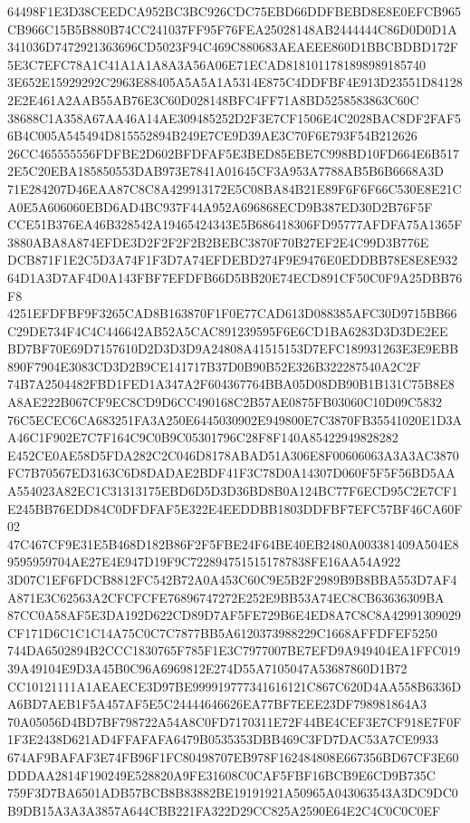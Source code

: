 \documentclass[UTF8,fontset=fandol,zihao=-4,a4paper]{ctexart}
\begin{document}
{{64498F1E3D38CEEDCA952BC3BC926CDC75EBD66DDFBEBD8E8E0EFCB965CB966C15B5B880B74CC241037FF95F76FEA25028148AB2444444C86D0D0D1A
341036D7472921363696CD5023F94C469C880683AEAEEE860D1BBCBDBD172F5E3C7EFC78A1C41A1A1A8A3A56A06E71ECAD8181011781898989185740
3E652E15929292C2963E88405A5A5A1A5314E875C4DDFBF4E913D23551D841282E2E461A2AAB55AB76E3C60D028148BFC4FF71A8BD5258583863C60C
38688C1A358A67AA46A14AE309485252D2F3E7CF1506E4C2028BAC8DF2FAF56B4C005A545494D815552894B249E7CE9D39AE3C70F6E793F54B212626
26CC465555556FDFBE2D602BFDFAF5E3BED85EBE7C998BD10FD664E6B5172E5C20EBA185850553DAB973E7841A01645CF3A953A7788AB5B6B6668A3D
71E284207D46EAA87C8C8A429913172E5C08BA84B21E89F6F6F66C530E8E21CA0E5A606060EBD6AD4BC937F44A952A696868ECD9B387ED30D2B76F5F
CCE51B376EA46B328542A19465424343E5B686418306FD95777AFDFA75A1365F3880ABA8A874EFDE3D2F2F2F2B2BEBC3870F70B27EF2E4C99D3B776E
DCB871F1E2C5D3A74F1F3D7A74EFDEBD274F9E9476E0EDDBB78E8E8E93264D1A3D7AF4D0A143FBF7EFDFB66D5BB20E74ECD891CF50C0F9A25DBB76F8
4251EFDFBF9F3265CAD8B163870F1F0E77CAD613D088385AFC30D9715BB66C29DE734F4C4C446642AB52A5CAC891239595F6E6CD1BA6283D3D3DE2EE
BD7BF70E69D7157610D2D3D3D9A24808A41515153D7EFC189931263E3E9EBB890F7904E3083CD3D2B9CE141717B37D0B90B52E326B322287540A2C2F
74B7A2504482FBD1FED1A347A2F604367764BBA05D08DB90B1B131C75B8E8A8AE222B067CF9EC8CD9D6CC490168C2B57AE0875FB03060C10D09C5832
76C5ECEC6CA683251FA3A250E6445030902E949800E7C3870FB35541020E1D3AA46C1F902E7C7F164C9C0B9C05301796C28F8F140A85422949828282
E452CE0AE58D5FDA282C2C046D8178ABAD51A306E8F00606063A3A3AC3870FC7B70567ED3163C6D8DADAE2BDF41F3C78D0A14307D060F5F5F56BD5AA
A554023A82EC1C31313175EBD6D5D3D36BD8B0A124BC77F6ECD95C2E7CF1E245BB76EDD84C0DFDFAF5E322E4EEDDBB1803DDFBF7EFC57BF46CA60F02
47C467CF9E31E5B468D182B86F2F5FBE24F64BE40EB2480A003381409A504E89595959704AE27E4E947D19F9C7228947515151787838FE16AA54A922
3D07C1EF6FDCB8812FC542B72A0A453C60C9E5B2F2989B9B8BBA553D7AF4A871E3C62563A2CFCFCFE76896747272E252E9BB53A74EC8CB63636309BA
87CC0A58AF5E3DA192D622CD89D7AF5FE729B6E4ED8A7C8C8A42991309029CF171D6C1C1C14A75C0C7C7877BB5A6120373988229C1668AFFDFEF5250
744DA6502894B2CCC1830765F785F1E3C7977007BE7EFD9A949404EA1FFC01939A49104E9D3A45B0C96A6969812E274D55A7105047A53687860D1B72
CC10121111A1AEAECE3D97BE999919777341616121C867C620D4AA558B6336DA6BD7AEB1F5A457AF5E5C24444646626EA77BF7EEE23DF798981864A3
70A05056D4BD7BF798722A54A8C0FD7170311E72F44BE4CEF3E7CF918E7F0F1F3E2438D621AD4FFAFAFA6479B0535353DBB469C3FD7DAC53A7CE9933
674AF9BAFAF3E74FB96F1FC80498707EB978F162484808E667356BD67CF3E60DDDAA2814F190249E528820A9FE31608C0CAF5FBF16BCB9E6CD9B735C
759F3D7BA6501ADB57BCB8B83882BE19191921A50965A043063543A3DC9DC0B9DB15A3A3A3857A644CBB221FA322D29CC825A2590E64E2C4C0C0C0EF
}}
\end{document}
